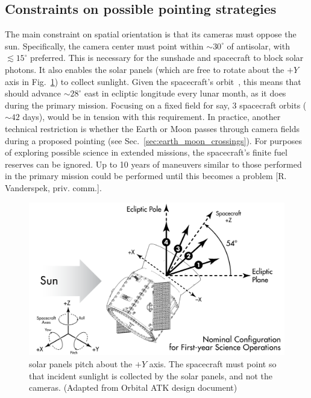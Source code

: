 \subsection{Constraints on possible pointing strategies}
\label{sec:constraints_on_pointings}
The main constraint on \tesss spatial orientation is that its cameras must oppose the sun.
Specifically, the camera center must point within $\sim30^\circ$ of antisolar, with $\lesssim15^\circ$ preferred.
This is necessary for the sunshade and spacecraft to block solar photons.
It also enables the solar panels (which are free to rotate about the $+Y$ axis in Fig.~\ref{fig:spacecraft_angles}) to collect sunlight.
Given the spacecraft's orbit~\citep{gangestad_high_2013}, this means that \tess should advance $\sim28^\circ$ east in ecliptic longitude every lunar month, as it does during the primary mission.
Focusing on a fixed field for say, 3 spacecraft orbits ($\sim42$ days), would be in tension with this requirement.
In practice, another technical restriction is whether the Earth or Moon passes through \tesss camera fields during a proposed pointing (see Sec.~\ref{sec:earth_moon_crossings}).
For purposes of exploring possible science in extended missions, the spacecraft's finite fuel reserves can be ignored.
Up to 10 years of maneuvers similar to those performed in the primary mission could be performed until this becomes a problem [R. Vanderspek, priv. comm.].

\begin{figure}[t] %
	\centering
	\includegraphics{figures/spacecraft_angles.pdf}
	\caption{\tesss solar panels pitch about the $+Y$ axis. The spacecraft must point so that incident sunlight is collected by the solar panels, and not the cameras. (Adapted from Orbital ATK design document) }
	\label{fig:spacecraft_angles}
\end{figure}